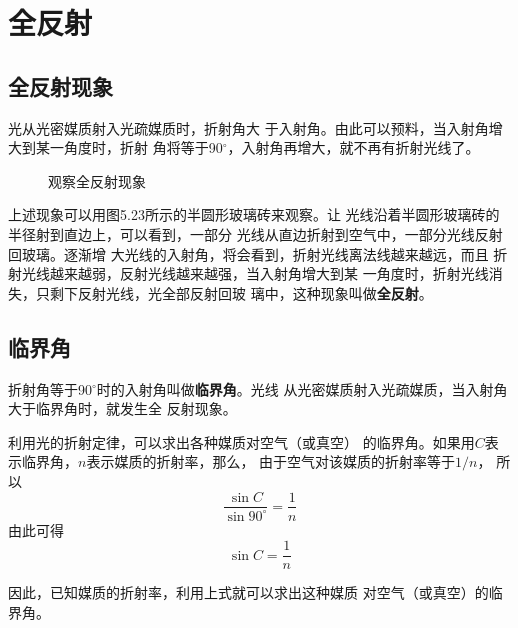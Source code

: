 \section{全反射}
\subsection{全反射现象}

光从光密媒质射入光疏媒质时，折射角大
于入射角。由此可以预料，当入射角增大到某一角度时，折射
角将等于90$^\circ$，入射角再增大，就不再有折射光线了。
    \begin{figure}[htp]
        \centering
        \caption{观察全反射现象}
    \end{figure}

上述现象可以用图5.23所示的半圆形玻璃砖来观察。让
光线沿着半圆形玻璃砖的半径射到直边上，可以看到，一部分
光线从直边折射到空气中，一部分光线反射回玻璃。逐渐增
大光线的入射角，将会看到，折射光线离法线越来越远，而且
折射光线越来越弱，反射光线越来越强，当入射角增大到某
一角度时，折射光线消失，只剩下反射光线，光全部反射回玻
璃中，这种现象叫做\textbf{全反射}。

\subsection{临界角}

折射角等于90$^\circ$时的入射角叫做\textbf{临界角}。光线
从光密媒质射入光疏媒质，当入射角大于临界角时，就发生全
反射现象。

利用光的折射定律，可以求出各种媒质对空气（或真空）
的临界角。如果用$C$表示临界角，$n$表示媒质的折射率，那么，
由于空气对该媒质的折射率等于$1/n$，
所以
\[\frac{\sin C}{\sin 90^\circ}=\frac{1}{n} \]
由此可得
\[\sin C=\frac{1}{n} \]

因此，已知媒质的折射率，利用上式就可以求出这种媒质
对空气（或真空）的临界角。

